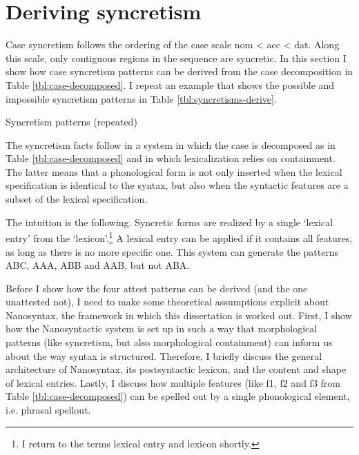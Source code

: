\section{Deriving syncretism}\label{sec:syncretism}

Case syncretism follows the ordering of the case scale \ac{nom} < \ac{acc} < \ac{dat}. Along this scale, only contiguous regions in the sequence are syncretic. In this section I show how case syncretism patterns can be derived from the case decomposition in Table \ref{tbl:case-decomposed}. I repeat an example that shows the possible and impossible syncretism patterns in Table \ref{tbl:syncretisms-derive}.

\begin{table}[ht]
  \center
  \caption {Syncretism patterns (repeated)}
    
  \label{tbl:syncretisms-derive}
\end{table}

The syncretism facts follow in a system in which the case is decomposed as in Table \ref{tbl:case-decomposed} and in which lexicalization relies on containment. The latter means that a phonological form is not only inserted when the lexical specification is identical to the syntax, but also when the syntactic features are a subset of the lexical specification.

The intuition is the following. Syncretic forms are realized by a single `lexical entry' from the `lexicon'.\footnote{
I return to the terms lexical entry and lexicon shortly.
} A lexical entry can be applied if it contains all features, as long as there is no more specific one. This system can generate the patterns ABC, AAA, ABB and AAB, but not ABA.



Before I show how the four attest patterns can be derived (and the one unattested not), I need to make some theoretical assumptions explicit about Nanosyntax, the framework in which this dissertation is worked out. First, I show how the Nanosyntactic system is set up in such a way that morphological patterns (like syncretism, but also morphological containment) can inform us about the way syntax is structured. Therefore, I briefly discuss the general architecture of Nanosyntax, its postsyntactic lexicon, and the content and shape of lexical entries. Lastly, I discuss how multiple features (like \ac{f}1, \ac{f}2 and \ac{f}3 from Table \ref{tbl:case-decomposed}) can be spelled out by a single phonological element, i.e. phrasal spellout.

